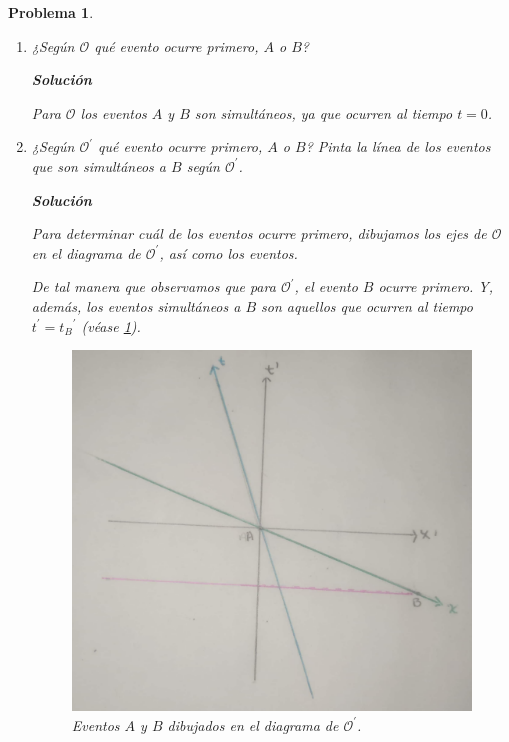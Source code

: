 \documentclass[12pt]{article}
\theoremstyle{break}
\newtheorem{exercise}{Problema}
\theoremstyle{nonumberbreak}
\newcommand*{\observer}{\mathcal{O}}
\newcommand*{\primeobserver}{\mathcal{O}^{\prime}}
\newcommand*{\inlinesol}{\vspace*{10pt}\textbf{Solución}\vspace*{10pt}}
\begin{document}
\begin{exercise}
\begin{enumerate}[label = \alph*)]
            \item ¿Según \(\observer\) qué evento ocurre primero, \(A\) o \(B\)?
            
            \inlinesol

            Para \(\observer\) los eventos \(A\) y \(B\) son simultáneos, ya que ocurren al tiempo \(t = 0\).

            \item ¿Según \(\primeobserver\) qué evento ocurre primero, \(A\) o \(B\)? Pinta la línea de los eventos que son simultáneos a \(B\) según \(\primeobserver\).
            
            \inlinesol

            Para determinar cuál de los eventos ocurre primero, dibujamos los ejes de \(\observer\) en el diagrama de \(\primeobserver\), así como los eventos.

            De tal manera que observamos que para \(\primeobserver\), el evento \(B\) ocurre primero. Y, además, los eventos simultáneos a \(B\) son aquellos que ocurren al tiempo \(t^{\prime} = {t_{B}}^{\prime}\) (véase \cref{fig:ABInOPrime}).

            \begin{figure}[htb]
                \centering
                \includegraphics[scale = 0.15]{fig-2.3.pdf}
                \caption{Eventos \(A\) y \(B\) dibujados en el diagrama de \(\primeobserver\).}
                \label{fig:ABInOPrime}
            \end{figure}


\end{enumerate}
\end{exercise}
\end{document}
